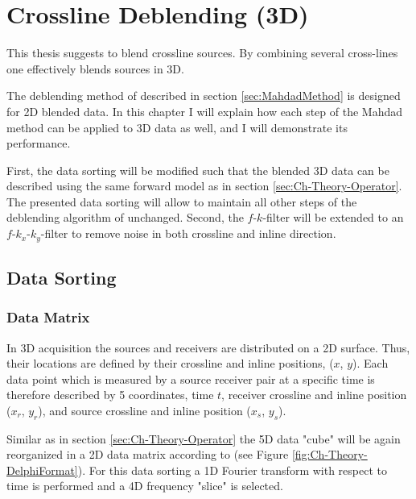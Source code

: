 \chapter{Crossline Deblending (3D)} \label{chap:MahdadMethod3d}


This thesis suggests to blend crossline sources. By combining several cross-lines one effectively blends sources in 3D.

The deblending method of \citet{Mahdad-Deblending-Method} described in section \ref{sec:MahdadMethod} is designed for 2D blended data. In this chapter I will explain how each step of the Mahdad method can be applied to 3D data as well, and I will demonstrate its performance.

First, the data sorting will be modified such that the blended 3D data can be described using the same forward model as in section \ref{sec:Ch-Theory-Operator}. The presented data sorting will allow to maintain all other steps of the deblending algorithm of \citet{Mahdad-Deblending-Method} unchanged. Second, the $f$-$k$-filter will be extended to an $f$-$k_x$-$k_y$-filter to remove noise in both crossline and inline direction.

\section{Data Sorting} \label{sec:Ch-Theory-3dExtension-DataSorting}

\subsection*{Data Matrix}

In 3D acquisition the sources and receivers are distributed on a 2D surface. Thus, their locations are defined by their crossline and inline positions, ($x$, $y$). Each data point which is measured by a source receiver pair at a specific time is therefore described by 5 coordinates, time $t$, receiver crossline and inline position ($x_r$, $y_r$), and source crossline and inline position ($x_s$, $y_s$).

Similar as in section \ref{sec:Ch-Theory-Operator} the 5D data "cube" will be again reorganized in a 2D data matrix according to \citet{Delphi-Format} (see Figure \ref{fig:Ch-Theory-DelphiFormat}). For this data sorting a 1D Fourier transform with respect to time is performed and a 4D frequency "slice" is selected.

